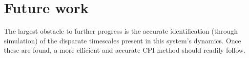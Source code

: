 \documentclass[11pt]{article}
\begin{document}
\section*{Future work}
The largest obstacle to further progress is the accurate identification (through simulation) of the disparate timescales present in this system's dynamics. Once these are found, a more efficient and accurate CPI method should readily follow.



\end{document}
